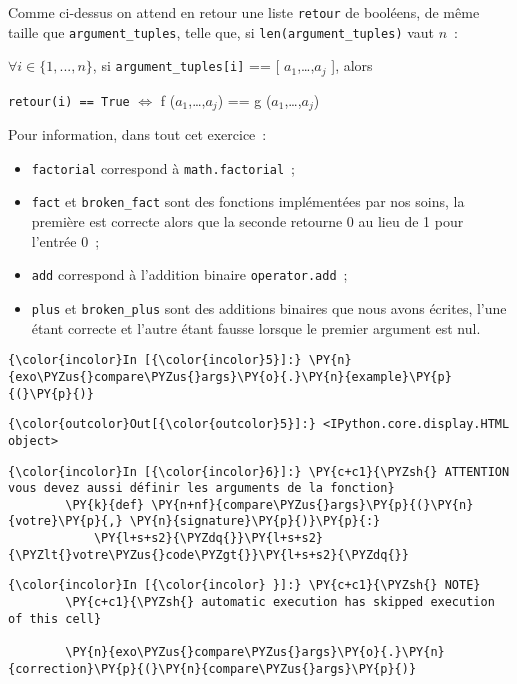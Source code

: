 Comme ci-dessus on attend en retour une liste \texttt{retour} de
booléens, de même taille que \texttt{argument\_tuples}, telle que, si
\texttt{len(argument\_tuples)} vaut \(n\)~:

\(\forall i \in \{1,...,n\}\), si \texttt{argument\_tuples{[}i{]}} ==
{[} \(a_1\),\ldots{},\(a_j\) {]}, alors

\texttt{retour(i)\ ==\ True} \(\Longleftrightarrow\) f
(\(a_1\),\ldots{},\(a_j\)) == g (\(a_1\),\ldots{},\(a_j\))

    Pour information, dans tout cet exercice~:

\begin{itemize}
\tightlist
\item
  \texttt{factorial} correspond à \texttt{math.factorial}~;
\item
  \texttt{fact} et \texttt{broken\_fact} sont des fonctions implémentées
  par nos soins, la première est correcte alors que la seconde retourne
  0 au lieu de 1 pour l'entrée 0~;
\item
  \texttt{add} correspond à l'addition binaire \texttt{operator.add}~;
\item
  \texttt{plus} et \texttt{broken\_plus} sont des additions binaires que
  nous avons écrites, l'une étant correcte et l'autre étant fausse
  lorsque le premier argument est nul.
\end{itemize}

    \begin{Verbatim}[commandchars=\\\{\}]
{\color{incolor}In [{\color{incolor}5}]:} \PY{n}{exo\PYZus{}compare\PYZus{}args}\PY{o}{.}\PY{n}{example}\PY{p}{(}\PY{p}{)}
\end{Verbatim}


\begin{Verbatim}[commandchars=\\\{\}]
{\color{outcolor}Out[{\color{outcolor}5}]:} <IPython.core.display.HTML object>
\end{Verbatim}
            
    \begin{Verbatim}[commandchars=\\\{\}]
{\color{incolor}In [{\color{incolor}6}]:} \PY{c+c1}{\PYZsh{} ATTENTION vous devez aussi définir les arguments de la fonction}
        \PY{k}{def} \PY{n+nf}{compare\PYZus{}args}\PY{p}{(}\PY{n}{votre}\PY{p}{,} \PY{n}{signature}\PY{p}{)}\PY{p}{:}
            \PY{l+s+s2}{\PYZdq{}}\PY{l+s+s2}{\PYZlt{}votre\PYZus{}code\PYZgt{}}\PY{l+s+s2}{\PYZdq{}}
\end{Verbatim}


    \begin{Verbatim}[commandchars=\\\{\}]
{\color{incolor}In [{\color{incolor} }]:} \PY{c+c1}{\PYZsh{} NOTE}
        \PY{c+c1}{\PYZsh{} automatic execution has skipped execution of this cell}
        
        \PY{n}{exo\PYZus{}compare\PYZus{}args}\PY{o}{.}\PY{n}{correction}\PY{p}{(}\PY{n}{compare\PYZus{}args}\PY{p}{)}
\end{Verbatim}



    
    
    

